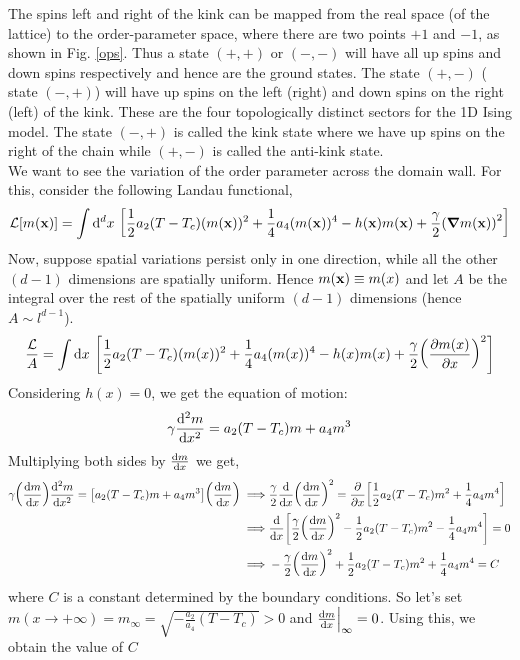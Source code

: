 \noindent
The spins left and right of the kink can be mapped from the real space (of the lattice) to the order-parameter space, where there are two points $+1$ and $-1$, as shown in Fig. \ref{ops}. Thus a state $(+,+)$ or $(-,-)$ will have all up spins and down spins respectively and hence are the ground states. The state $(+,-)$ ( state $(-,+)$) will have up spins on the left (right) and down spins on the right (left) of the kink. These are the four topologically distinct sectors for the 1D Ising model. The state $(-,+)$ is called the kink state where we have up spins on the right of the chain while $(+,-)$ is called the anti-kink state.\\[0.2cm]
We want to see the variation of the order parameter across the domain wall. For this, consider the following Landau functional, 
\begin{equation*}
    \SL[m(\vb{x})] = \int \dd^d x \ \qty[\frac{1}{2}a_2(T-T_c)(m(\vb{x}))^2 + \frac{1}{4}a_4 (m(\vb{x}))^4 - h(\vb{x})m(\vb{x}) +\frac{\gamma}{2}\qty(\grad m(\vb{x}))^2]
\end{equation*}
Now, suppose spatial variations persist only in one direction, while all the other $(d-1)$ dimensions are spatially uniform. Hence $m(\vb{x}) \equiv m(x)$ and let $A$ be the integral over the rest of the spatially uniform $(d-1)$ dimensions (hence $A \sim l^{d-1}$).
\begin{equation}
    \frac{\SL}{A} = \int \dd x \ \qty[\frac{1}{2}a_2(T-T_c)(m(x))^2 + \frac{1}{4}a_4 (m(x))^4 - h(x)m(x) +\frac{\gamma}{2}\qty(\pdv{m(x)}{x})^2]
\end{equation}
Considering $h(x)=0$, we get the equation of motion:
\begin{equation}\label{eos}
    \gamma \dv[2]{m}{x} = a_2(T-T_c)m + a_4m^3
\end{equation}
Multiplying both sides by $\dv{m}{x}$ we get,
\begin{align*}
    {\gamma}\qty(\dv{m}{x}) \dv[2]{m}{x} = \qty[a_2(T-T_c)m + a_4m^3]\qty(\dv{m}{x})\implies &\frac{\gamma}{2}\dv{x}\qty(\dv{m}{x})^2 =\pdv{x} \qty[\frac{1}{2}a_2(T-T_c)m^2 + \frac{1}{4}a_4 m^4]\\
   \implies & \dv{x}\qty[\frac{\gamma}{2}\qty(\dv{m}{x})^2 - \frac{1}{2}a_2(T-T_c)m^2 - \frac{1}{4}a_4 m^4] =0\\
   \implies & -\frac{\gamma}{2}\qty(\dv{m}{x})^2 + \frac{1}{2}a_2(T-T_c)m^2 + \frac{1}{4}a_4 m^4 = C
\end{align*}
where $C$ is a constant determined by the boundary conditions. So let's set $m(x\to +\infty) = m_\infty = \sqrt{-\frac{a_2}{a_4}(T-T_c)}>0$ and $\dv{m}{x}\Big|_{\infty} = 0$. Using this, we obtain the value of $C$ 
